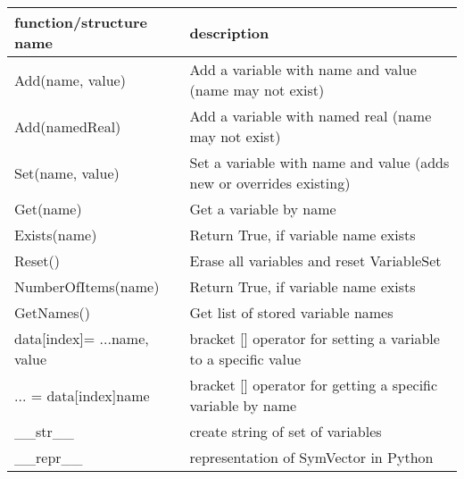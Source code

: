\begin{center}
\footnotesize
\begin{longtable}{| p{8cm} | p{8cm} |} 
\hline
{\bf function/structure name} & {\bf description}\\ \hline
  Add(name, value) & Add a variable with name and value (name may not exist)\\ \hline 
  Add(namedReal) & Add a variable with named real (name may not exist)\\ \hline 
  Set(name, value) & Set a variable with name and value (adds new or overrides existing)\\ \hline 
  Get(name) & Get a variable by name\\ \hline 
  Exists(name) & Return True, if variable name exists\\ \hline 
  Reset() & Erase all variables and reset VariableSet\\ \hline 
  NumberOfItems(name) & Return True, if variable name exists\\ \hline 
  GetNames() & Get list of stored variable names\\ \hline 
  data[index]= ...name, value & bracket [] operator for setting a variable to a specific value\\ \hline 
  ... = data[index]name & bracket [] operator for getting a specific variable by name\\ \hline 
  \_\_str\_\_ & create string of set of variables\\ \hline  
  \_\_repr\_\_ & representation of SymVector in Python\\ \hline  
\end{longtable}
\end{center}





